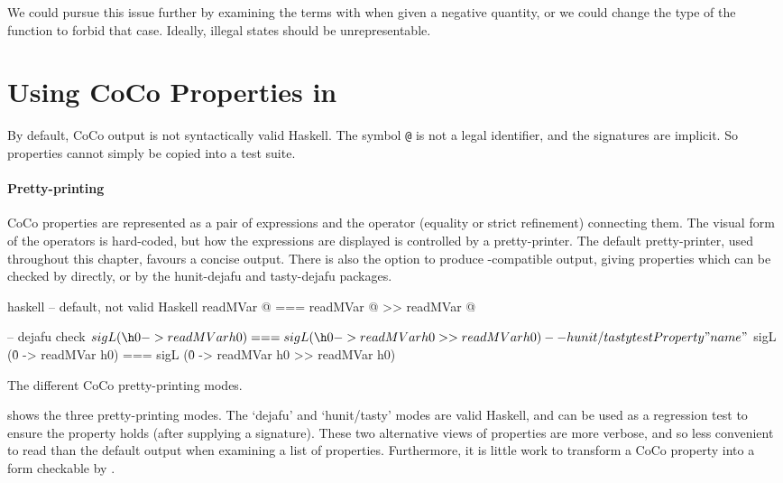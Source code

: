 We could pursue this issue further by examining the terms with
\dejafu{} when given a negative quantity, or we could change the type
of the function to forbid that case.  Ideally, illegal states should
be unrepresentable.

\section{Using CoCo Properties in \dejafu{}}
\label{sec:coco-dejafu}

By default, CoCo output is not syntactically valid Haskell.  The
symbol \texttt{@} is not a legal identifier, and the signatures are
implicit.  So properties cannot simply be copied into a test suite.

\paragraph{Pretty-printing}
CoCo properties are represented as a pair of expressions and the
operator (equality or strict refinement) connecting them.  The visual
form of the operators is hard-coded, but how the expressions are
displayed is controlled by a pretty-printer.  The default
pretty-printer, used throughout this chapter, favours a concise
output.  There is also the option to produce \dejafu{}-compatible
output, giving properties which can be checked by \dejafu{} directly,
or by the hunit-dejafu \parencite{hunit_dejafu} and tasty-dejafu
\parencite{tasty_dejafu} packages.

\begin{listing}
  \centering
  \begin{cminted}{haskell}
-- default, not valid Haskell
readMVar @  ===  readMVar @ >> readMVar @

-- dejafu
check $ sigL (\h0 -> readMVar h0) === sigL (\h0 -> readMVar h0 >> readMVar h0)

-- hunit/tasty
testProperty "name" $
  sigL (\h0 -> readMVar h0) === sigL (\h0 -> readMVar h0 >> readMVar h0)
  \end{cminted}
  \caption{The different CoCo pretty-printing modes.}\label{lst:coco_ppr}
\end{listing}

 shows the three pretty-printing modes.  The
`dejafu' and `hunit/tasty' modes are valid Haskell, and can be used as
a regression test to ensure the property holds (after supplying a
signature).  These two alternative views of properties are more
verbose, and so less convenient to read than the default output when
examining a list of properties.  Furthermore, it is little work to
transform a CoCo property into a form checkable by \dejafu{}.

